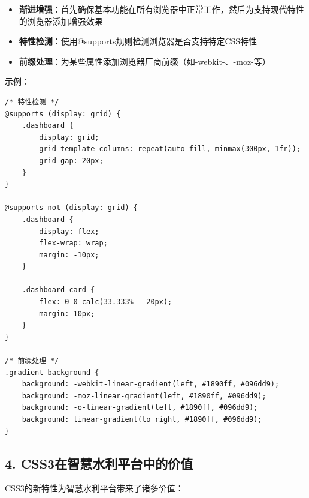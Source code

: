 \begin{itemize}
\tightlist
\item
  \textbf{渐进增强}：首先确保基本功能在所有浏览器中正常工作，然后为支持现代特性的浏览器添加增强效果
\item
  \textbf{特性检测}：使用@supports规则检测浏览器是否支持特定CSS特性
\item
  \textbf{前缀处理}：为某些属性添加浏览器厂商前缀（如-webkit-、-moz-等）
\end{itemize}

示例：

\begin{lstlisting}
/* 特性检测 */
@supports (display: grid) {
    .dashboard {
        display: grid;
        grid-template-columns: repeat(auto-fill, minmax(300px, 1fr));
        grid-gap: 20px;
    }
}

@supports not (display: grid) {
    .dashboard {
        display: flex;
        flex-wrap: wrap;
        margin: -10px;
    }
    
    .dashboard-card {
        flex: 0 0 calc(33.333% - 20px);
        margin: 10px;
    }
}

/* 前缀处理 */
.gradient-background {
    background: -webkit-linear-gradient(left, #1890ff, #096dd9);
    background: -moz-linear-gradient(left, #1890ff, #096dd9);
    background: -o-linear-gradient(left, #1890ff, #096dd9);
    background: linear-gradient(to right, #1890ff, #096dd9);
}
\end{lstlisting}

\subsection{4.
CSS3在智慧水利平台中的价值}\label{css3ux5728ux667aux6167ux6c34ux5229ux5e73ux53f0ux4e2dux7684ux4ef7ux503c}

CSS3的新特性为智慧水利平台带来了诸多价值：

